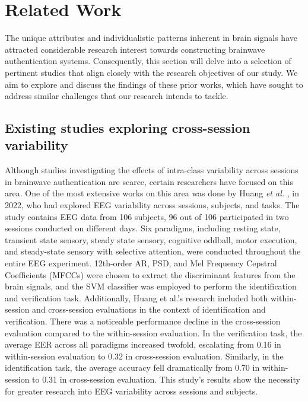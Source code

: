 \chapter{Related Work}
\label{ch:Related Work}
The unique attributes and individualistic patterns inherent in brain signals have attracted considerable research interest towards constructing brainwave authentication systems. Consequently, this section will delve into a selection of pertinent studies that align closely with the research objectives of our study. We aim to explore and discuss the findings of these prior works, which have sought to address similar challenges that our research intends to tackle. 

\section{Existing studies exploring cross-session variability}
\label{sec:Related Work:Existing studies exploring cross-session variability}
Although studies investigating the effects of intra-class variability across sessions in brainwave authentication are scarce, certain researchers have focused on this area. One of the most extensive works on this area was done by Huang \textit{et al.} \cite{huang2022m3cv}, in 2022, who had explored EEG variability across sessions, subjects, and tasks. The study contains EEG data from 106 subjects, 96 out of 106 participated in two sessions conducted on different days. Six paradigms, including resting state, transient state sensory, steady state sensory, cognitive oddball, motor execution, and steady-state sensory with selective attention, were conducted throughout the entire EEG experiment. 12th-order AR, PSD, and Mel Frequency Cepstral Coefficients (MFCCs) were chosen to extract the discriminant features from the brain signals, and the SVM classifier was employed to perform the identification and verification task. Additionally, Huang et al.'s research included both within-session and cross-session evaluations in the context of identification and verification. There was a noticeable performance decline in the cross-session evaluation compared to the within-session evaluation. In the verification task, the average EER across all paradigms increased twofold, escalating from 0.16 in within-session evaluation to 0.32 in cross-session evaluation. Similarly, in the identification task, the average accuracy fell dramatically from 0.70 in within-session to 0.31 in cross-session evaluation. This study's results show the necessity for greater research into EEG variability across sessions and subjects. 
\smallskip 

